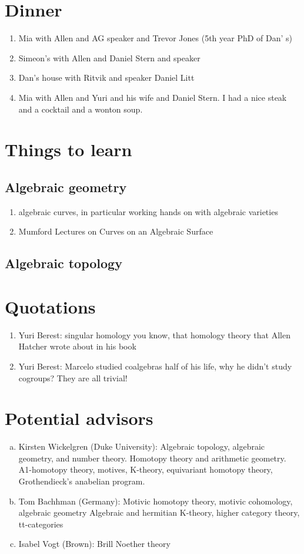 \documentclass[12pt]{article}
\begin{document}
\section{Dinner}
\begin{enumerate}
    \item Mia with Allen and AG speaker and Trevor Jones (5th year PhD of Dan'
    s)
    \item Simeon's with Allen and Daniel Stern and speaker
    \item Dan's house with Ritvik and speaker Daniel Litt
    \item Mia with Allen and Yuri and his wife and Daniel Stern. I had a nice steak and a cocktail
    and a wonton soup.
\end{enumerate}

\section{Things to learn}
\subsection{Algebraic geometry}
\begin{enumerate}
    \item algebraic curves, in particular working hands on with algebraic varieties
    \item Mumford Lectures on Curves on an Algebraic Surface
\end{enumerate}
\subsection{Algebraic topology}

\section{Quotations}
\begin{enumerate}
    \item Yuri Berest: singular homology you know, that homology theory that Allen Hatcher wrote about in his book
    \item Yuri Berest: Marcelo studied coalgebras half of his life, why he didn't study cogroups? They are all trivial!
\end{enumerate}

\section{Potential advisors}
\begin{enumerate}[(a)]
    \item Kirsten Wickelgren (Duke University): Algebraic topology, algebraic geometry, and number theory. Homotopy theory and arithmetic geometry. A1-homotopy theory, motives, K-theory, equivariant homotopy theory, Grothendieck’s anabelian program.
    \item Tom Bachhman (Germany): Motivic homotopy theory, motivic cohomology, algebraic geometry Algebraic and hermitian K-theory, higher category theory, tt-categories
    \item Isabel Vogt (Brown): Brill Noether theory
\end{enumerate}
\end{document}
